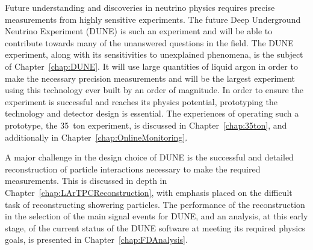 Future understanding and discoveries in neutrino physics requires precise measurements from highly sensitive experiments.  The future Deep Underground Neutrino Experiment (DUNE) is such an experiment and will be able to contribute towards many of the unanswered questions in the field.  The DUNE experiment, along with its sensitivities to unexplained phenomena, is the subject of Chapter~\ref{chap:DUNE}.  It will use large quantities of liquid argon in order to make the necessary precision measurements and will be the largest experiment using this technology ever built by an order of magnitude.  In order to ensure the experiment is successful and reaches its physics potential, prototyping the technology and detector design is essential.  The experiences of operating such a prototype, the 35~ton experiment, is discussed in Chapter~\ref{chap:35ton}, and additionally in Chapter~\ref{chap:OnlineMonitoring}.

A major challenge in the design choice of DUNE is the successful and detailed reconstruction of particle interactions necessary to make the required measurements.  This is discussed in depth in Chapter~\ref{chap:LArTPCReconstruction}, with emphasis placed on the difficult task of reconstructing showering particles.  The performance of the reconstruction in the selection of the main signal events for DUNE, and an analysis, at this early stage, of the current status of the DUNE software at meeting its required physics goals, is presented in Chapter~\ref{chap:FDAnalysis}.


